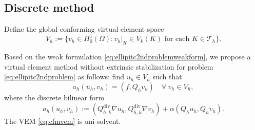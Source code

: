 \documentclass[10pt]{amsart}
\renewcommand{\div}{\operatorname{div}}
\numberwithin{equation}{section}
\begin{document}


\subsection{Discrete method}
Define the global conforming virtual element space
\[
V_h:=\{v_h\in H_0^1(\Omega): v_h|_K\in V_k(K) \textrm{ for each } K\in\mathcal T_h\}.
\]

Based on the weak formulation \eqref{eq:ellipitc2ndproblemweakform}, we propose a virtual element method without extrinsic stabilization for problem \eqref{eq:ellipitc2ndproblem} as follows: find $u_h\in V_h$ such that
\begin{equation}\label{eq:cfmvem}
a_h(u_h, v_h)=(f, Q_hv_h)\quad\forall~v_h\in V_h,
\end{equation} 
where the discrete bilinear form 
\[
a_h(u_h, v_h):=(Q_{h,k}^{\div}\nabla u_h, Q_{h,k}^{\div}\nabla v_h)+\alpha(Q_hu_h, Q_hv_h).
\]
The VEM \eqref{eq:cfmvem} is uni-solvent.
\end{document}
